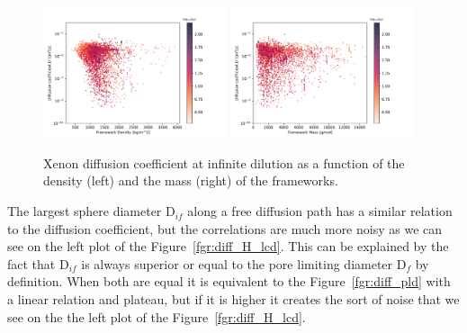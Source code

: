 \documentclass[main]{subfiles}
\begin{document}
\begin{figure}[ht]
  \centering
    \includegraphics[width=0.48\textwidth]{figures/5-diffusion/D_log-density_s_+.pdf}
    \includegraphics[width=0.48\textwidth]{figures/5-diffusion/D_log-mass_s_+.pdf}
    \caption{Xenon diffusion coefficient at infinite dilution as a function of the density (left) and the mass (right) of the frameworks. }\label{fgr:diff_density_mass}
\end{figure}

The largest sphere diameter D$_{if}$ along a free diffusion path has a similar relation to the diffusion coefficient, but the correlations are much more noisy as we can see on the left plot of the Figure~\ref{fgr:diff_H_lcd}.  This can be explained by the fact that D$_{if}$ is always superior or equal to the pore limiting diameter  D$_{f}$ by definition. When both are equal it is equivalent to the Figure~\ref{fgr:diff_pld} with a linear relation and plateau, but if it is higher it creates the sort of noise that we see on the the left plot of the Figure~\ref{fgr:diff_H_lcd}. 
\end{document}
